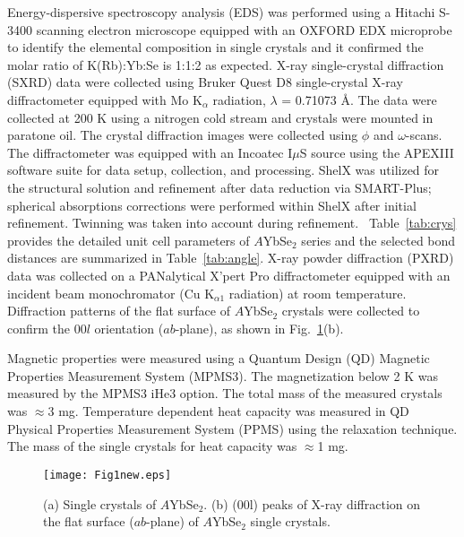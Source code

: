 \documentclass[%
 aip,
 amsmath,amssymb,
 reprint,%
]{revtex4-1}
\begin{document}
Energy-dispersive spectroscopy analysis (EDS) was performed using a Hitachi S-3400 scanning electron microscope equipped with an OXFORD EDX microprobe to identify the elemental composition in single crystals and it confirmed the molar ratio of K(Rb):Yb:Se is 1:1:2 as expected. 
X-ray single-crystal diffraction (SXRD) data were collected using Bruker Quest D8 single-crystal X-ray diffractometer equipped with Mo K$_\alpha$ radiation, $\lambda$ = 0.71073 \AA. The data were collected at 200 K using a nitrogen cold stream and crystals were mounted in paratone oil. The crystal diffraction images were collected using $\phi$ and $\omega$-scans. The diffractometer was equipped with an Incoatec I$\mu$S source using the APEXIII software suite for data setup, collection, and processing. ShelX was utilized for the structural solution and refinement after data reduction via SMART-Plus; spherical absorptions corrections were performed within ShelX after initial refinement.  Twinning was taken into account during refinement.~\cite{sheldrick2015crystal} Table~\ref{tab:crys} provides the detailed unit cell parameters of $A$YbSe$_2$ series and the selected bond distances are summarized in Table~\ref{tab:angle}. X-ray powder diffraction (PXRD) data was collected on a PANalytical X'pert Pro diffractometer equipped with an incident beam monochromator (Cu K$_{\alpha1}$ radiation) at room temperature. Diffraction patterns of the flat surface of $A$YbSe$_2$ crystals were collected to confirm the 00$l$ orientation ($ab$-plane), as shown in Fig.~\ref{fig:crys}(b).


Magnetic properties were measured using a Quantum Design (QD) Magnetic Properties Measurement System (MPMS3). The magnetization below 2 K was measured by the MPMS3 iHe3 option. The total mass of the measured crystals was $\approx$3 mg. Temperature dependent heat capacity was measured in QD Physical Properties Measurement System (PPMS) using the relaxation technique. The mass of the single crystals for heat capacity was $\approx$1 mg.

\begin{figure}[tbh]
\texttt{[image: Fig1new.eps]}
\caption {\label{fig:crys}(a) Single crystals of $A$YbSe$_2$. (b) (00l) peaks of X-ray diffraction on the flat surface ($ab$-plane) of $A$YbSe$_2$ single crystals.}
\end{figure}
\end{document}
